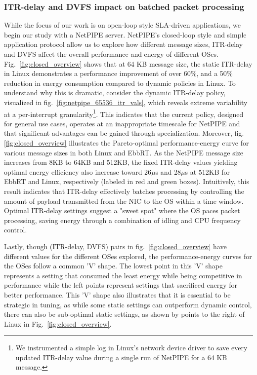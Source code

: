 \subsubsection{ITR-delay and DVFS impact on batched packet processing}
\label{sec:closed_energy}
While the focus of our work is on open-loop style SLA-driven applications, we begin our study with a NetPIPE server. NetPIPE's closed-loop style and simple application protocol allow us to explore how different message sizes, ITR-delay and DVFS affect the overall performance and energy of different OSes. Fig.~\ref{fig:closed_overview} shows that at 64 KB message size, the static ITR-delay in Linux demonstrates a performance improvement of over 60\%, and a 50\% reduction in energy consumption compared to dynamic policies in Linux. To understand why this is dramatic, consider the dynamic ITR-delay policy, visualized in fig.~\ref{fig:netpipe_65536_itr_vals}, which reveals extreme variability at a per-interrupt granularity\footnote{We instrumented a simple log in Linux's network device driver to save every updated ITR-delay value during a single run of NetPIPE for a 64 KB message.}. This indicates that the current policy, designed for general use cases, operates at an inappropriate timescale for NetPIPE and that significant advantages can be gained through specialization. Moreover, fig.\ref{fig:closed_overview} illustrates the Pareto-optimal performance-energy curve for various message sizes in both Linux and EbbRT. As the NetPIPE message size increases from 8KB to 64KB and 512KB, the fixed ITR-delay values yielding optimal energy efficiency also increase toward 26$\mu$s and 28$\mu$s at 512KB for EbbRT and Linux, respectively (labeled in red and green boxes). Intuitively, this result indicates that ITR-delay effectively batches processing by controlling the amount of payload transmitted from the NIC to the OS within a time window. Optimal ITR-delay settings suggest a "sweet spot" where the OS paces packet processing, saving energy through a combination of idling and CPU frequency control.

Lastly, though (ITR-delay, DVFS) pairs in fig.~\ref{fig:closed_overview} have different values for the different OSes explored, the performance-energy curves for the OSes follow a common 'V' shape. The lowest point in this 'V' shape represents a setting that consumed the least energy while being competitive in performance while the left points represent settings that sacrificed energy for better performance. This 'V' shape also illustrates that it is essential to be strategic in tuning, as while some static settings can outperform dynamic control, there can also be sub-optimal static settings, as shown by points to the right of Linux in Fig.~\ref{fig:closed_overview}. 

